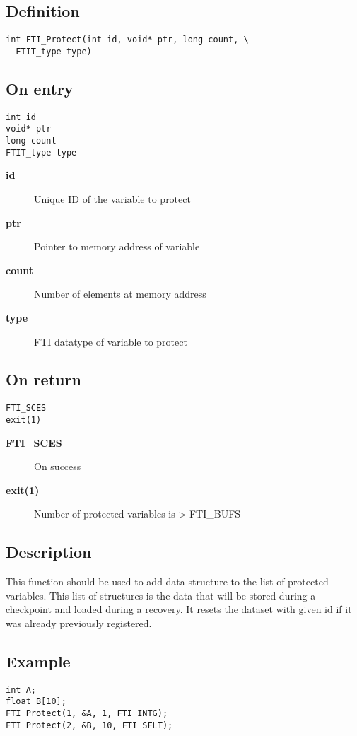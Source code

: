 \documentclass{refrep}
\begin{document}
\subsection*{Definition}
\begin{lstlisting}[frame=single]
int FTI_Protect(int id, void* ptr, long count, \
  FTIT_type type)
\end{lstlisting}
\subsection*{On entry}
\begin{lstlisting}[frame=single]
int id
void* ptr
long count
FTIT_type type
\end{lstlisting}
\begin{description}
\item[\textbf{id}] Unique ID of the variable to protect
\item[\textbf{ptr}] Pointer to memory address of variable
\item[\textbf{count}] Number of elements at memory address
\item[\textbf{type}] FTI datatype of variable to protect
\end{description}
\subsection*{On return}
\begin{lstlisting}[frame=single]
FTI_SCES
exit(1)
\end{lstlisting}
\begin{description}
\item[\textbf{FTI\_SCES}] On success
\item[\textbf{exit(1)}] Number of protected variables is > FTI\_BUFS
\end{description}
\subsection*{Description}
This function should be used to add data structure to the list of protected variables. This list of structures is the data that will be stored during a checkpoint and loaded during a recovery. It resets the dataset with given id if it was already previously registered.
\subsection*{Example}
\begin{center}
\begin{lstlisting}[frame=single]
int A;
float B[10];
FTI_Protect(1, &A, 1, FTI_INTG);
FTI_Protect(2, &B, 10, FTI_SFLT);
\end{lstlisting}
\end{center}
\newpage
\end{document}
